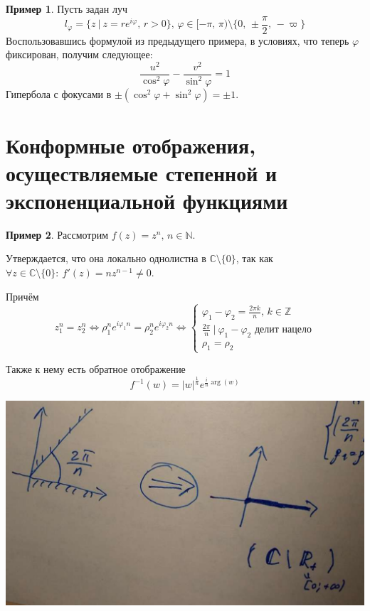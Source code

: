 \documentclass[a4paper,12pt]{article}
\renewcommand{\phi}{\ensuremath{\varphi}}
\theoremstyle{plain}
\theoremstyle{definition}
\newtheorem*{example}{Пример}
\theoremstyle{remark}
\begin{document}
\begin{example}
	Пусть задан луч
	\[
		l_\phi = \{z \:\vert\: z = re^{i\phi},\, r > 0\},\, \phi \in [-\pi,\, \pi) \setminus \{0,\, \pm\frac{\pi}{2},\, -\varpi\}
	\]
	Воспользовавшись формулой из предыдущего примера, в условиях, что теперь $\phi$ фиксирован, получим следующее:
	\[
		\frac{u^2}{\cos^2\phi} - \frac{v^2}{\sin^2 \phi} = 1
	\]
	Гипербола с фокусами в $\pm(\cos^2\phi + \sin^2\phi) = \pm1$.
\end{example}

\section{Конформные отображения, осуществляемые степенной и экспоненциальной функциями}
\begin{example}
	Рассмотрим $f(z) = z^n,\, n \in \mathbb{N}$.

	Утверждается, что она локально однолистна в $\mathbb{C} \setminus \{0\}$, так как $\forall z \in \mathbb{C} \setminus \{0\} :\: f'(z) = nz^{n - 1} \neq 0$.

	Причём 
	\[
		z_1^n = z_2^n \Leftrightarrow \rho_1^ne^{i\phi_1n} = \rho_2^ne^{i\phi_2n} \Leftrightarrow 
		\begin{cases}
			\phi_1 - \phi_2 = \frac{2\pi k}{n},\, k \in \mathbb{Z}\\ 
			\frac{2\pi}{n} \:\vert\: \phi_1 - \phi_2 \text{  делит нацело}\\
			\rho_1 = \rho_2
		\end{cases}
	\]

	Также к нему есть обратное отображение
	\[
		f^{-1}(w) = \vert w\vert^{\frac{1}{n}}e^{\frac{i}{n}\arg(w)}
	\]

	\includegraphics[scale=0.3]{assets/power_ex.png}
\end{example}
\end{document}
